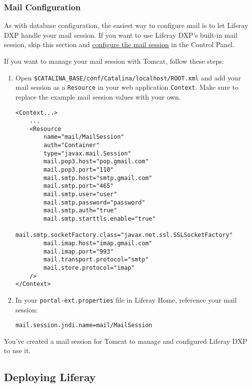 \subsubsection{Mail Configuration}\label{mail-configuration}

As with database configuration, the easiest way to configure mail is to
let Liferay DXP handle your mail session. If you want to use Liferay
DXP's built-in mail session, skip this section and
\href{/docs/7-1/deploy/-/knowledge_base/d/installing-liferay\#configuring-mail}{configure
the mail session} in the Control Panel.

If you want to manage your mail session with Tomcat, follow these steps:

\begin{enumerate}
\def\labelenumi{\arabic{enumi}.}
\item
  Open \texttt{\$CATALINA\_BASE/conf/Catalina/localhost/ROOT.xml} and
  add your mail session as a \texttt{Resource} in your web application
  \texttt{Context}. Make sure to replace the example mail session values
  with your own.

\begin{verbatim}
<Context...>
    ...
    <Resource
        name="mail/MailSession"
        auth="Container"
        type="javax.mail.Session"
        mail.pop3.host="pop.gmail.com"
        mail.pop3.port="110"
        mail.smtp.host="smtp.gmail.com"
        mail.smtp.port="465"
        mail.smtp.user="user"
        mail.smtp.password="password"
        mail.smtp.auth="true"
        mail.smtp.starttls.enable="true"
        mail.smtp.socketFactory.class="javax.net.ssl.SSLSocketFactory"
        mail.imap.host="imap.gmail.com"
        mail.imap.port="993"
        mail.transport.protocol="smtp"
        mail.store.protocol="imap"
    />
</Context>
\end{verbatim}
\item
  In your \texttt{portal-ext.properties} file in Liferay Home, reference
  your mail session:

\begin{verbatim}
mail.session.jndi.name=mail/MailSession
\end{verbatim}
\end{enumerate}

You've created a mail session for Tomcat to manage and configured
Liferay DXP to use it.

\subsection{Deploying Liferay}\label{deploying-liferay}

